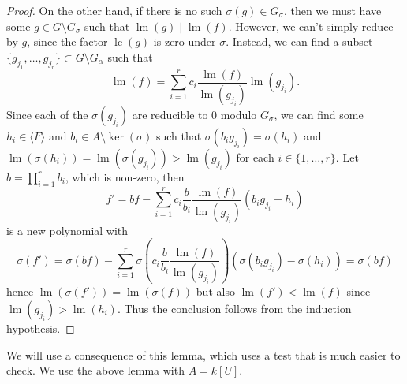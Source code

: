 \documentclass[a4paper, 12pt]{article}
\DeclareMathOperator{\LM}{lm}
\DeclareMathOperator{\LC}{lc}
\theoremstyle{changedot}
\theoremstyle{changedotbreak}
\theoremstyle{nonumberplain}
\newtheorem{proof}{Proof}
\begin{document}
\begin{proof}
  On the other hand, if there is no such $\sigma(g) \in G_{\sigma}$, then we must have some $g \in G \setminus G_{\sigma}$ such that $\LM(g) \mid \LM(f)$. However, we can't simply reduce by $g$, since the factor $\LC(g)$ is zero under $\sigma$. Instead, we can find a subset $\{g_{j_{1}}, \dots, g_{j_{r}}\} \subset G \setminus G_{\alpha}$ such that \[\LM(f) = \sum_{i = 1}^{r} c_{i} \frac{\LM(f)}{\LM(g_{j_{i}})} \LM(g_{j_{i}}).\]
  Since each of the $\sigma(g_{j_{i}})$ are reducible to 0 modulo $G_{\sigma}$, we can find some $h_{i} \in \langle F \rangle$ and $b_{i} \in A \setminus \ker(\sigma)$ such that $\sigma(b_{i} g_{j_{i}}) = \sigma(h_{i})$ and $\LM(\sigma(h_{i})) = \LM(\sigma(g_{j_{i}})) > \LM(g_{j_{i}})$ for each $i \in \{1, \dots, r\}$. Let $b = \prod_{i = 1}^{r} b_{i}$, which is non-zero, then
  \[f' = b f - \sum_{i = 1}^{r} c_{i} \frac{b}{b_{i}} \frac{\LM(f)}{\LM(g_{j_{i}})}(b_{i}g_{j_{i}} - h_{i})\]
  is a new polynomial with
  \[\sigma(f') = \sigma(b f) - \sum_{i = 1}^{r} \sigma\left(c_{i} \frac{b}{b_{i}} \frac{\LM(f)}{\LM(g_{j_{i}})}\right) (\sigma(b_{i} g_{j_{i}}) - \sigma(h_{i})) = \sigma(b f)\]
  hence $\LM(\sigma(f')) = \LM(\sigma(f))$ but also $\LM(f') < \LM(f)$ since $\LM(g_{j_{i}}) > \LM(h_{i})$. Thus the conclusion follows from the induction hypothesis.
\end{proof}

We will use a consequence of this lemma, which uses a test that is much easier to check. We use the above lemma with $A = k[U]$.
\end{document}
